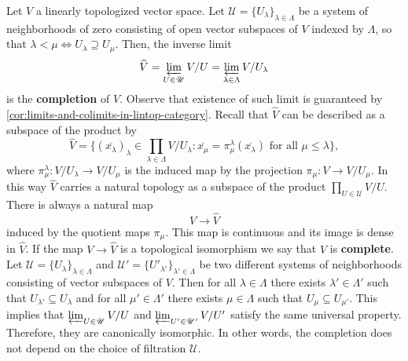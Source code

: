 \begin{definition}\label{def:completion}
	Let $V$ a linearly topologized vector space. Let $\mathscr{U} = \{U_{\lambda}\}_{\lambda\in \Lambda}$ be a system of neighborhoods of zero consisting of open vector subspaces of $V$ indexed by $\Lambda$, so that $\lambda < \mu \iff U_{\lambda} \supseteq U_{\mu}$. Then, the inverse limit
	\[
		\widehat{V} = \varprojlim_{U\in \mathscr{U}} V/U = \varprojlim_{\lambda\in \Lambda} V/U_{\lambda}
	\]
	is the \textbf{completion} of $V$. Observe that existence of such limit is guaranteed by \cref{cor:limits-and-colimits-in-lintop-category}. Recall that $\widehat{V}$ can be described as a subspace of the product by
	\[
		\widehat{V} = \{(\overline{x_{\lambda}})_{\lambda}\in \prod_{\lambda\in \Lambda} V/U_{\lambda}\colon  \overline{x_{\mu}} = \pi_{\mu}^{\lambda}(\overline{x_{\lambda}}) \text{ for all } \mu \leq \lambda \},
	\] 
	where $\pi_{\mu}^{\lambda}\colon V/U_{\lambda} \to V/U_{\mu}$ is the induced map by the projection $\pi_{\mu}\colon V \to V/U_{\mu}$. In this way $\widehat{V}$ carries a natural topology as a subspace of the product $\prod_{U\in \mathscr{U}} V/U$.  There is always a natural map
	\[
		V \to \widehat{V}
	\]
	induced by the quotient maps $\pi_{\mu}$. This map is continuous and its image is dense in $\widehat{V}$. If the map $V \to \widehat{V}$ is a topological isomorphism we say that $V$ is \textbf{complete}. Let $\mathscr{U} = \{U_{\lambda}\}_{\lambda\in \Lambda}$ and $\mathscr{U}' = \{U'_{\lambda'}\}_{\lambda' \in \Lambda}$ be two different systems of neighborhoods consisting of vector subspaces of $V$. Then for all $\lambda \in \Lambda$ there exists $\lambda'\in \Lambda'$ such that $U_{\lambda'} \subseteq U_{\lambda}$ and for all $\mu'\in \Lambda'$ there exists $\mu\in \Lambda$ such that $U_{\mu}\subseteq U_{\mu'}$. This implies that $\varprojlim_{U\in \mathscr{U}} V/U$ and $\varprojlim_{U'\in \mathscr{U}'} V/U'$ satisfy the same universal property. Therefore, they are canonically isomorphic. In other words, the completion does not depend on the choice of filtration $\mathscr{U}$.
\end{definition}

